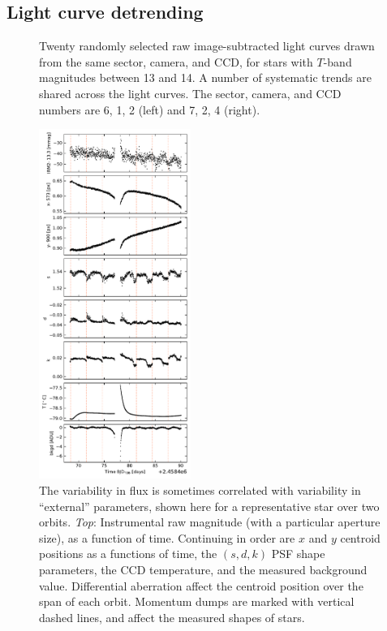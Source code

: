 \documentclass[12pt,twocolumn,tighten]{aastex62}
\begin{document}
\subsection{Light curve detrending}
\label{subsec:lcdetrending}

\begin{figure}[!t]
	\vspace{-0.5cm}
	\caption{
	Twenty randomly selected raw image-subtracted light curves drawn
	from the same sector, camera,
	and CCD, for stars with $T$-band magnitudes between 13 and 14.
	A number of systematic trends are shared across the light curves.
	The sector, camera, and CCD numbers are 6, 1, 2 (left) and 7, 2, 4 (right).
	\label{fig:lc_systematics}
	}
\end{figure}

\begin{figure}[!t]
	\begin{center}
		\leavevmode
		\includegraphics[width=0.44\textwidth]{external_parameters_vs_time_sec6cam1ccd1.pdf}
	\end{center}
	\vspace{-0.5cm}
	\caption{
    The variability in flux is sometimes correlated with variability
    in ``external'' parameters, shown here for a representative star
    over two orbits.  {\it Top}: Instrumental raw magnitude (with a
    particular aperture size), as a function of time.  Continuing in
    order are $x$ and $y$ centroid positions as a functions of time,
    the $(s,d,k)$ PSF shape parameters, the CCD temperature,  and the
    measured background value.  Differential aberration affect the
    centroid position over the span of each orbit.  Momentum dumps are
    marked with vertical dashed lines, and affect the measured shapes
    of stars.
		\label{fig:external_parameter_timeseries}
	}
\end{figure}
\end{document}
